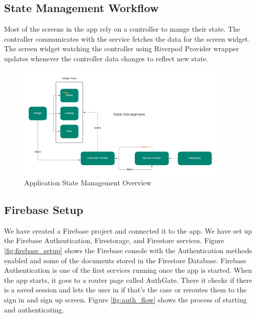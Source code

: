 \documentclass[a4paper, 12pt]{report} %
\begin{document}
        \FloatBarrier

        \subsection*{State Management Workflow}
        Most of the screens in the app rely on a controller to mange their state. The controller communicates with the service fetches the data for the screen widget. The screen widget watching the controller using Riverpod Provider wrapper updates whenever the controller data changes to reflect new state. 

        \begin{figure}[H]
            \centering
            \includegraphics[width=0.9\textwidth]{Images/state_management.png}
            \caption{Application State Management Overview}
            \label{fig:state_management}
        \end{figure}


        \subsection{Firebase Setup}
            We have created a Firebase project and connected it to the app. We have set up the Firebase Authentication, Firestorage, and Firestore services. Figure \ref{fig:firebase_setup} shows the Firebase console with the Authentication methods enabled and some of the documents stored in the Firestore Database. Firebase Authentication is one of the first services running once the app is started. When the app starts, it goes to a router page called AuthGate. There it checks if there is a saved session and lets the user in if that's the case or reroutes them to the sign in and sign up screen. Figure \ref{fig:auth_flow} shows the process of starting and authenticating.
\end{document}
